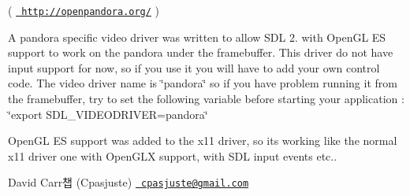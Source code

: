 ( \href{http://openpandora.org/}{\texttt{ http\+://openpandora.\+org/}} )
\begin{DoxyItemize}
\item A pandora specific video driver was written to allow S\+DL 2. with Open\+GL ES support to work on the pandora under the framebuffer. This driver do not have input support for now, so if you use it you will have to add your own control code. The video driver name is \char`\"{}pandora\char`\"{} so if you have problem running it from the framebuffer, try to set the following variable before starting your application \+: \char`\"{}export S\+D\+L\+\_\+\+V\+I\+D\+E\+O\+D\+R\+I\+V\+E\+R=pandora\char`\"{}
\item Open\+GL ES support was added to the x11 driver, so it\textquotesingle{}s working like the normal x11 driver one with Open\+G\+LX support, with S\+DL input event\textquotesingle{}s etc..
\end{DoxyItemize}

David Carr챕 (Cpasjuste) \href{mailto:cpasjuste@gmail.com}{\texttt{ cpasjuste@gmail.\+com}} 
